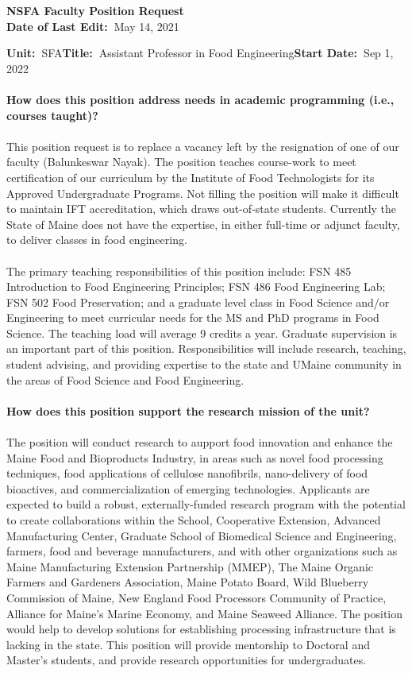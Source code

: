 \documentclass[11pt]{article}
\begin{document}
\sloppy \rmfamily
\begin{center}\textbf{NSFA Faculty Position Request\\Date of Last Edit:~}May 14, 2021\end{center}

\noindent\textbf{Unit:~}SFA\hfill\textbf{Title:~}Assistant Professor in Food Engineering\hfill \textbf{Start Date:~}Sep 1, 2022\\~\\
\textbf{How does this position address needs in academic programming (i.e., courses taught)?}\\~\\
\small\sffamily 
This position request is to replace a vacancy left by the resignation of one of our faculty (Balunkeswar Nayak).  The position teaches course-work to meet certification of our curriculum by the Institute of Food Technologists for its Approved Undergraduate Programs. Not filling the position will make it difficult to maintain IFT accreditation, which draws out-of-state students. Currently the State of Maine does not have the expertise, in either full-time or adjunct faculty, to deliver classes in food engineering.
\\~\\
The primary teaching responsibilities of this position include: FSN 485 Introduction to Food Engineering Principles; FSN 486 Food Engineering Lab; FSN 502 Food Preservation; and a graduate level class in Food Science and/or Engineering to meet curricular needs for the MS and PhD programs in Food Science. The teaching load will average 9 credits a year. Graduate supervision is an important part of this position. Responsibilities will include research, teaching, student advising, and providing expertise to the state and UMaine community in the areas of Food Science and Food Engineering.
\\~\\
\textbf{\rmfamily How does this position support the research mission of the unit?}\\~\\
The position will conduct research to aupport food innovation and enhance the Maine Food and Bioproducts Industry, in areas such as novel food processing techniques, food applications of cellulose nanofibrils, nano-delivery of food bioactives, and commercialization of emerging technologies. Applicants are expected to build a robust, externally-funded research program with the potential to create collaborations within the School, Cooperative Extension, Advanced Manufacturing Center, Graduate School of Biomedical Science and Engineering, farmers, food and beverage manufacturers, and with other organizations such as Maine Manufacturing Extension Partnership (MMEP), The Maine Organic Farmers and Gardeners Association, Maine Potato Board, Wild Blueberry Commission of Maine, New England Food Processors Community of Practice, Alliance for Maine's Marine Economy, and Maine Seaweed Alliance. The position would help to develop solutions for establishing processing infrastructure that is lacking in the state. This position will provide mentorship to Doctoral and Master’s students, and provide research opportunities for undergraduates.
\end{document}
